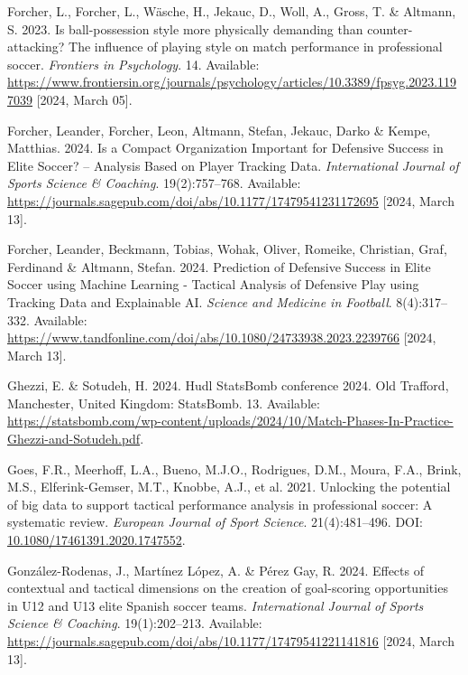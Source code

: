 \documentclass[
  a4paper,
  twoside]{uoe-thesis-template}
\newlength{\cslhangindent}
\newenvironment{CSLReferences}[2] %
 {\begin{list}{}{%
  \setlength{\itemindent}{0pt}
  \setlength{\leftmargin}{0pt}
  \setlength{\parsep}{0pt}
  \ifodd #1
   \setlength{\leftmargin}{\cslhangindent}
   \setlength{\itemindent}{-1\cslhangindent}
  \fi
  \setlength{\itemsep}{#2\baselineskip}}}
 {\end{list}}
\begin{document}
\begin{CSLReferences}{0}{0}
Forcher, L., Forcher, L., Wäsche, H., Jekauc, D., Woll, A., Gross, T. \&
Altmann, S. 2023. Is ball-possession style more physically demanding
than counter-attacking? {The} influence of playing style on match
performance in professional soccer. \emph{Frontiers in Psychology}. 14.
Available:
\url{https://www.frontiersin.org/journals/psychology/articles/10.3389/fpsyg.2023.1197039}
{[}2024, March 05{]}.

Forcher, Leander, Forcher, Leon, Altmann, Stefan, Jekauc, Darko \&
Kempe, Matthias. 2024. Is a {Compact} {Organization} {Important} for
{Defensive} {Success} in {Elite} {Soccer}? -- {Analysis} {Based} on
{Player} {Tracking} {Data}. \emph{International Journal of Sports
Science \& Coaching}. 19(2):757--768. Available:
\url{https://journals.sagepub.com/doi/abs/10.1177/17479541231172695}
{[}2024, March 13{]}.

Forcher, Leander, Beckmann, Tobias, Wohak, Oliver, Romeike, Christian,
Graf, Ferdinand \& Altmann, Stefan. 2024. Prediction of {Defensive}
{Success} in {Elite} {Soccer} using {Machine} {Learning} - {Tactical}
{Analysis} of {Defensive} {Play} using {Tracking} {Data} and
{Explainable} {AI}. \emph{Science and Medicine in Football}.
8(4):317--332. Available:
\url{https://www.tandfonline.com/doi/abs/10.1080/24733938.2023.2239766}
{[}2024, March 13{]}.

Ghezzi, E. \& Sotudeh, H. 2024. Hudl StatsBomb conference 2024. Old
Trafford, Manchester, United Kingdom: StatsBomb. 13. Available:
\url{https://statsbomb.com/wp-content/uploads/2024/10/Match-Phases-In-Practice-Ghezzi-and-Sotudeh.pdf}.

Goes, F.R., Meerhoff, L.A., Bueno, M.J.O., Rodrigues, D.M., Moura, F.A.,
Brink, M.S., Elferink-Gemser, M.T., Knobbe, A.J., et al. 2021. Unlocking
the potential of big data to support tactical performance analysis in
professional soccer: {A} systematic review. \emph{European Journal of
Sport Science}. 21(4):481--496. DOI:
\href{https://doi.org/10.1080/17461391.2020.1747552}{10.1080/17461391.2020.1747552}.

González-Rodenas, J., Martínez López, A. \& Pérez Gay, R. 2024. Effects
of contextual and tactical dimensions on the creation of goal-scoring
opportunities in {U12} and {U13} elite {Spanish} soccer teams.
\emph{International Journal of Sports Science \& Coaching}.
19(1):202--213. Available:
\url{https://journals.sagepub.com/doi/abs/10.1177/17479541221141816}
{[}2024, March 13{]}.


\end{CSLReferences}
\end{document}
